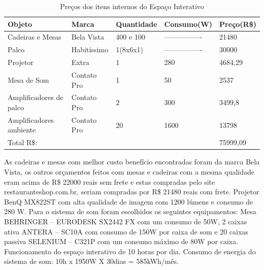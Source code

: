 \begin{table}[h]
\centering
\caption{Preços dos itens internos do Espaço Interativo}
\label{PrecoInternoEspacoInterativo}
\begin{tabular}{|l|l|l|l|l|}
\hline
Objeto                  & Marca       & Quantidade & Consumo(W)       & Preço(R\$) \\ \hline
Cadeiras e Mesas        & Bela Vista  & 400 e 100  & ---------------- & 21480      \\ \hline
Palco                   & Habitíssimo & 1(8x6x1)   & ---------------- & 30000      \\ \hline
Projetor                & Extra       & 1          & 280              & 4684,29    \\ \hline
Mesa de Som             & Contato Pro & 1          & 50               & 2537       \\ \hline
Amplificadores de palco & Contato Pro & 2          & 300              & 3499,8     \\ \hline
Amplificadores ambiente & Contato Pro & 20         & 1600             & 13798      \\ \hline
Total R\$:              &             &            &                  & 75999,09   \\ \hline
\end{tabular}
\end{table}

	As cadeiras e mesas com melhor custo benefício encontradas foram da marca Bela Vista, os outros orçamentos feitos com mesas e cadeiras com a mesma qualidade eram acima de R\$ 22000 reais sem frete e estas compradas pelo site restauranteshop.com.br, seriam compradas por R\$ 21480 reais com frete.
	Projetor BenQ MX822ST com alta qualidade de imagem com 1200 lúmens e consumo de 280 W.
	Para o sistema de som foram escolhidos os seguintes equipamentos: Mesa BEHRINGER – EURODESK SX2442 FX com um consumo de 50W, 2 caixas ativa ANTERA – SC10A com consumo de 150W por caixa de som e  20 caixas passiva SELENIUM – C321P com um consumo máximo de 80W por caixa.
	Funcionamento do espaço interativo de 10 horas por dia.
	Consumo de energia do sistema de som: 10h x 1950W X 30dias = 585kWh/mês.
	
